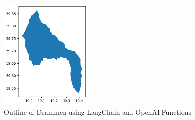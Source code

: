 \begin{figure}
    \centering
    \includegraphics[width=0.4\textwidth]{../figs/drammen_plot_langchain.png}
    \caption{Outline of Drammen using LangChain and OpenAI Functions}
    \label{fig:drammen-plot-langchain}
\end{figure}

\glsresetall
